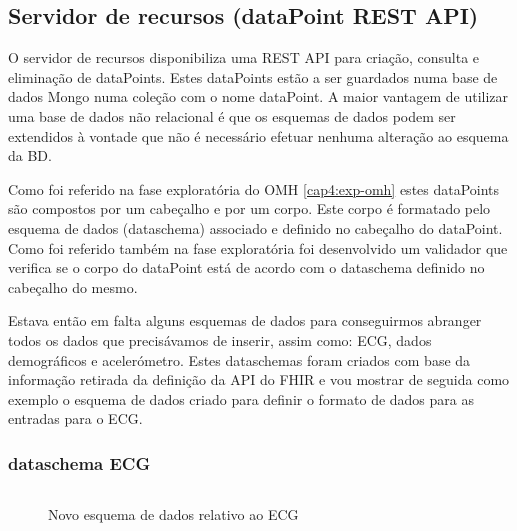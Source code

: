 \subsection{Servidor de recursos (dataPoint REST API) }
O servidor de recursos disponibiliza uma \gls{REST} \gls{API} para criação, consulta e eliminação de dataPoints. Estes dataPoints estão a ser guardados numa base de dados Mongo numa coleção com o nome dataPoint. A maior vantagem de utilizar uma base de dados não relacional é que os esquemas de dados podem ser extendidos à vontade que não é necessário efetuar nenhuma alteração ao esquema da BD. \par 
Como foi referido na fase exploratória do \gls{OMH} \ref{cap4:exp-omh} estes dataPoints são compostos por um cabeçalho e por um corpo. Este corpo é formatado pelo esquema de dados (dataschema) associado e definido no cabeçalho do dataPoint. Como foi referido também na fase exploratória foi desenvolvido um validador que verifica se o corpo do dataPoint está de acordo com o dataschema definido no cabeçalho do mesmo. \par
Estava então em falta alguns esquemas de dados para conseguirmos abranger todos os dados que precisávamos de inserir, assim como: \gls{ECG}, dados demográficos e acelerómetro. Estes dataschemas foram criados com base da informação retirada da definição da \gls{API} do \gls{FHIR} e vou mostrar de seguida como exemplo o esquema de dados criado para definir o formato de dados para as entradas para o \gls{ECG}.
\subsubsection{dataschema ECG}
\begin{figure}[H]
\inputminted[fontsize=\scriptsize]{json}{code/ecg.json}
\caption[Novo esquema de dados relativo ao ECG]{Novo esquema de dados relativo ao ECG}
\label{f:ecgjsonschema}
\end{figure}

